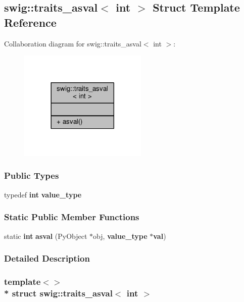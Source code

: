 \subsection{swig\+:\+:traits\+\_\+asval$<$ int $>$ Struct Template Reference}
\label{structswig_1_1traits__asval_3_01int_01_4}


Collaboration diagram for swig\+:\+:traits\+\_\+asval$<$ int $>$\+:
\nopagebreak
\begin{figure}[H]
\begin{center}
\leavevmode
\includegraphics[width=173pt]{d4/d1a/structswig_1_1traits__asval_3_01int_01_4__coll__graph}
\end{center}
\end{figure}
\subsubsection*{Public Types}
\begin{DoxyCompactItemize}
\item 
typedef {\bf int} {\bf value\+\_\+type}
\end{DoxyCompactItemize}
\subsubsection*{Static Public Member Functions}
\begin{DoxyCompactItemize}
\item 
static {\bf int} {\bf asval} (Py\+Object $\ast$obj, {\bf value\+\_\+type} $\ast${\bf val})
\end{DoxyCompactItemize}


\subsubsection{Detailed Description}
\subsubsection*{template$<$$>$\\*
struct swig\+::traits\+\_\+asval$<$ int $>$}



